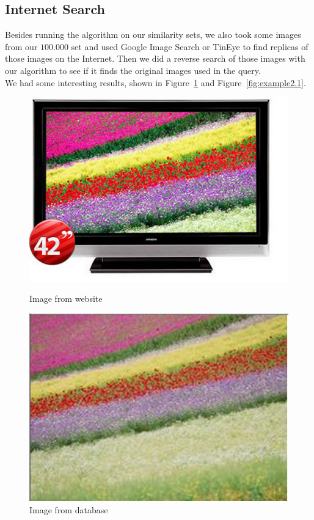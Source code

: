 \subsection{Internet Search}

Besides running the algorithm on our similarity sets, we also took some images from our $100.000$ set and used Google Image Search or TinEye to find replicas of those images on the Internet. Then we did a reverse search of those images with our algorithm to see if it finds the original images used in the query.\\
We had some interesting results, shown in Figure~\ref{fig:example1.1} and Figure~\ref{fig:example2.1}.\\

\begin{figure}[ht!]
\centering
\begin{minipage}{.5\textwidth}
	\centering
	\includegraphics[width=.8\linewidth]{images/fieldSite.png}
	\caption{Image from website}
	\label{fig:example1.1}
\end{minipage}%
\begin{minipage}{.5\textwidth}
	\centering
	\includegraphics[width=.8\linewidth]{images/field.png}
	\caption{Image from database}
\end{minipage}
\end{figure}

